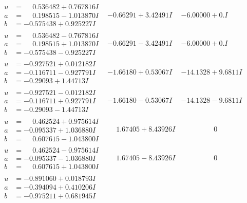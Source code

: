 \documentclass[1p]{elsarticle_modified}
\theoremstyle{definition}
\begin{document}
$$\begin{array}{c|c|c}
\begin{aligned}
u &= \phantom{-}0.536482 + 0.767816 I \\
a &= \phantom{-}0.198515 - 1.013870 I \\
b &= -0.575438 + 0.925227 I\end{aligned}
 & -0.66291 + 3.42491 I & -6.00000 + 0. I\phantom{ +0.000000I} \\ \hline\begin{aligned}
u &= \phantom{-}0.536482 - 0.767816 I \\
a &= \phantom{-}0.198515 + 1.013870 I \\
b &= -0.575438 - 0.925227 I\end{aligned}
 & -0.66291 - 3.42491 I & -6.00000 + 0. I\phantom{ +0.000000I} \\ \hline\begin{aligned}
u &= -0.927521 + 0.012182 I \\
a &= -0.116711 - 0.927791 I \\
b &= -0.29093 + 1.44713 I\end{aligned}
 & -1.66180 + 0.53067 I & -14.1328 + 9.6811 I \\ \hline\begin{aligned}
u &= -0.927521 - 0.012182 I \\
a &= -0.116711 + 0.927791 I \\
b &= -0.29093 - 1.44713 I\end{aligned}
 & -1.66180 - 0.53067 I & -14.1328 - 9.6811 I \\ \hline\begin{aligned}
u &= \phantom{-}0.462524 + 0.975614 I \\
a &= -0.095337 + 1.036880 I \\
b &= \phantom{-}0.607615 - 1.043800 I\end{aligned}
 & \phantom{-}1.67405 + 8.43926 I & \phantom{-0.000000 } 0 \\ \hline\begin{aligned}
u &= \phantom{-}0.462524 - 0.975614 I \\
a &= -0.095337 - 1.036880 I \\
b &= \phantom{-}0.607615 + 1.043800 I\end{aligned}
 & \phantom{-}1.67405 - 8.43926 I & \phantom{-0.000000 } 0 \\ \hline\begin{aligned}
u &= -0.891060 + 0.018793 I \\
a &= -0.394094 + 0.410206 I \\
b &= -0.975211 + 0.681945 I\end{aligned}

\end{array}$$
\end{document}
